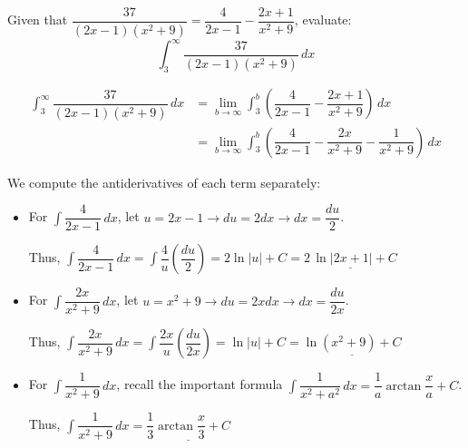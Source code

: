 \documentclass[noinstructornotes]{ximera}
\begin{document}
\begin{problem}
Given that $\displaystyle \dfrac{37}{(2x-1)(x^2+9)} = \dfrac{4}{2x-1} - \dfrac{2x+1}{x^2+9}$, evaluate: $$\displaystyle \int_3^{\infty} \dfrac{37}{(2x-1)(x^2+9)} \, dx$$
 

\begin{freeResponse}\begin{align} 
 \displaystyle \int_3^{\infty} \dfrac{37}{(2x-1)(x^2+9)} \, dx &= \lim_{b \rightarrow \infty} \displaystyle \int_3^{b} \left(\dfrac{4}{2x-1} - \dfrac{2x+1}{x^2+9}\right) \, dx \nonumber \\
 &= \lim_{b \rightarrow \infty} \displaystyle \int_3^{b} \left(\dfrac{4}{2x-1} - \dfrac{2x}{x^2+9}- \dfrac{1}{x^2+9}\right) \, dx  \label{eq1}
 \end{align}
 
 We compute the antiderivatives of each term separately:
 
 \begin{itemize}
 \item For $\displaystyle \int \dfrac{4}{2x-1} \, dx$, let $u = 2x -1 \rightarrow du = 2 dx \rightarrow   dx = \dfrac{du}{2}$.
 
\hspace{5mm} Thus, $\displaystyle \int \dfrac{4}{2x-1} \, dx = \int \dfrac{4}{u} \left(\dfrac{du}{2}\right) = 2 \ln |u| + C = \underline{2 \, \ln |2x+1| +C}$
 
 \vspace{3mm}
 
  \item For $\displaystyle \int \dfrac{2x}{x^2+9} \, dx$, let $u = x^2+9 \rightarrow du = 2x dx \rightarrow   dx = \dfrac{du}{2x}$.
  
\hspace{5mm}
 Thus, $\displaystyle \int \dfrac{2x}{x^2+9} \, dx = \int \dfrac{2x}{u} \left(\dfrac{du}{2x}\right) =  \ln |u| + C = \underline{ \ln (x^2+9) +C}$
 
  \item For $\displaystyle \int \dfrac{1}{x^2+9} \, dx$, recall the important formula $\displaystyle \int \dfrac{1}{x^2+a^2} \, dx = \dfrac{1}{a} \arctan \dfrac{x}{a} +C$.
    
\hspace{5mm} Thus, $\displaystyle \int \dfrac{1}{x^2+9} \, dx = \underline{\dfrac{1}{3} \arctan \dfrac{x}{3} +C}$
 
 \end{itemize}


\end{freeResponse}
\end{problem}
\end{document}
